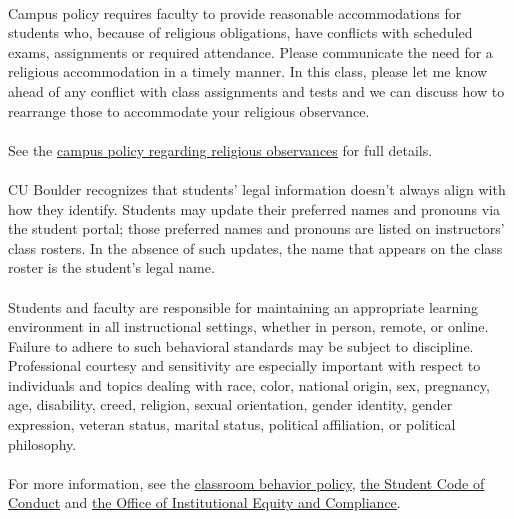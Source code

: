 \documentclass[11pt]{article}
\begin{document}
\\
Campus policy requires faculty to provide reasonable accommodations for students who, because of religious obligations, have conflicts with scheduled exams, assignments or required attendance. Please communicate the need for a religious accommodation in a timely manner.   In this class, please let me know ahead of any conflict with class assignments and tests and we can discuss how to rearrange those to accommodate your religious observance.\\
\\
See the \href{https://www.colorado.edu/compliance/policies/observance-religious-holidays-absences-classes-or-exams}{campus policy regarding religious observances} for full details.\\

\\
CU Boulder recognizes that students' legal information doesn't always align with how they identify. Students may update their preferred names and pronouns via the student portal; those preferred names and pronouns are listed on instructors' class rosters. In the absence of such updates, the name that appears on the class roster is the student's legal name.\\

\newpage
{}\\
Students and faculty are responsible for maintaining an appropriate learning environment in all instructional settings, whether in person, remote, or online. Failure to adhere to such behavioral standards may be subject to discipline. Professional courtesy and sensitivity are especially important with respect to individuals and topics dealing with race, color, national origin, sex, pregnancy, age, disability, creed, religion, sexual orientation, gender identity, gender expression, veteran status, marital status, political affiliation, or political philosophy.\\
\\
For more information, see the \href{https://www.colorado.edu/compliance/policies/student-classroom-course-related-behavior}{classroom behavior policy}, \href{https://www.colorado.edu/sccr/media/230}{the Student Code of Conduct} and \href{https://www.colorado.edu/oiec/}{the Office of Institutional Equity and Compliance}.\\
\end{document}
